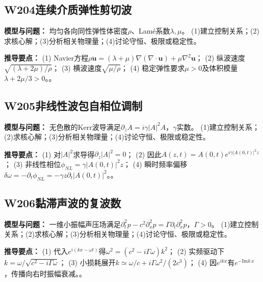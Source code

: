 \subsection*{W204\quad 连续介质弹性剪切波}

\textbf{模型与问题：} 均匀各向同性弹性体密度$\rho$、Lamé系数$\lambda,\mu$。 (1)建立控制关系；(2)求核心解；(3)分析相关物理量；(4)讨论守恒、极限或稳定性。

\par\textbf{推导要点：} (1) Navier方程$\rho\ddot{\mathbf u}=(\lambda+\mu)\nabla(\nabla\cdot\mathbf u)+\mu\nabla^2\mathbf u$； (2) 纵波速度$\sqrt{(\lambda+2\mu)/\rho}$； (3) 横波速度$\sqrt{\mu/\rho}$； (4) 稳定弹性要求$\mu>0$及体积模量$\lambda+2\mu/3>0$。。

\par\medskip

\subsection*{W205\quad 非线性波包自相位调制}

\textbf{模型与问题：} 无色散的Kerr波导满足$\partial_zA=i\gamma|A|^2A$，$\gamma$实数。 (1)建立控制关系；(2)求核心解；(3)分析相关物理量；(4)讨论守恒、极限或稳定性。

\par\textbf{推导要点：} (1) 对$|A|^2$求导得$\partial_z|A|^2=0$； (2) 因此$A(z,t)=A(0,t)e^{i\gamma|A(0,t)|^2z}$； (3) 非线性相位$\phi_{NL}=\gamma|A(0,t)|^2z$； (4) 瞬时频率偏移$\delta\omega=-\partial_t\phi_{NL}=-\gamma z\partial_t|A(0,t)|^2$。。

\par\medskip

\subsection*{W206\quad 黏滞声波的复波数}

\textbf{模型与问题：} 一维小振幅声压场满足$\partial_t^2p-c^2\partial_x^2p=\Gamma\partial_t\partial_x^2p$，$\Gamma>0$。 (1)建立控制关系；(2)求核心解；(3)分析相关物理量；(4)讨论守恒、极限或稳定性。

\par\textbf{推导要点：} (1) 代入$e^{i(kx-\omega t)}$得$\omega^2=(c^2-i\Gamma\omega)k^2$； (2) 实频驱动下$k=\omega/\sqrt{c^2-i\Gamma\omega}$； (3) 小损耗展开$k\simeq\omega/c+i\Gamma\omega^2/(2c^3)$； (4) 因$e^{ikx}$有$e^{-\mathrm{Im}k\,x}$，传播向右时振幅衰减。。

\par\medskip

